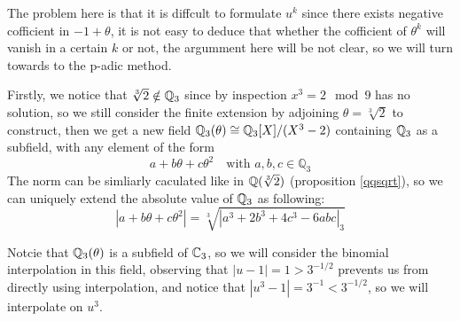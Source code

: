 The problem here is that it is diffcult to formulate \(u^{k}\) since there exists negative cofficient in \(-1+\theta\), it is not easy to deduce that whether the cofficient of \(\theta^k\) will vanish in a certain \(k\) or not, the argumment here will be not clear, so we will turn towards to the p-adic method.
\newline 

Firstly, we notice that \(\sqrt[3]{2} \notin \mathbb{Q}_3\) since by inspection \(x^3 = 2 \mod 9\) has no solution, so we still consider the finite extension by adjoining \(\theta = \sqrt[3]{2}\) to construct, then we get a new field \(\mathbb{Q}_3(\theta) \cong \mathbb{Q}_3[X]/(X^3-2)\) containing \(\mathbb{Q}_3\) as a subfield, with any element of the form
\[a+b\theta +c \theta^2 \quad  \text{with } a,b,c  \in \mathbb{Q}_3\]
The norm can be simliarly caculated like in \(\mathbb{Q}(\sqrt[3]{2})\) (proposition \ref{qqsqrt}), so we can uniquely extend the absolute value of \(\mathbb{Q}_3\) as following:
    \[|a+b\theta+c\theta^2| = \sqrt[3]{|a^3+2b^3+4c^3-6abc|_3}\]


    Notcie that \(\mathbb{Q}_3(\theta)\) is a subfield of \(\mathbb{C}_3\), so we will consider the binomial interpolation in this field, observing that \(|u-1| =1 > 3^{-1/2}\) prevents us from directly using interpolation, and notice that \(|u^3-1| = 3^{-1} < 3^{-1/2}\), so we will interpolate on \(u^3\).

